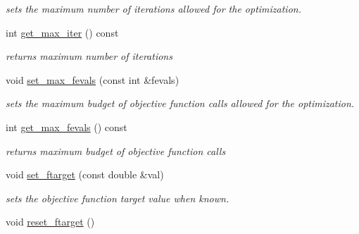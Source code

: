 \begin{DoxyCompactItemize}
\begin{DoxyCompactList}\small\item\em sets the maximum number of iterations allowed for the optimization. \end{DoxyCompactList}\item 
int \hyperlink{classlibcmaes_1_1Parameters_a95b8ff475b28b2cbf89cd147ab09eeee}{get\-\_\-max\-\_\-iter} () const 
\begin{DoxyCompactList}\small\item\em returns maximum number of iterations \end{DoxyCompactList}\item 
void \hyperlink{classlibcmaes_1_1Parameters_aa924cb4c8ffee0d148b63f5c0b55b4ce}{set\-\_\-max\-\_\-fevals} (const int \&fevals)
\begin{DoxyCompactList}\small\item\em sets the maximum budget of objective function calls allowed for the optimization. \end{DoxyCompactList}\item 
int \hyperlink{classlibcmaes_1_1Parameters_af738c73caee922feff43ba29218ea8ad}{get\-\_\-max\-\_\-fevals} () const 
\begin{DoxyCompactList}\small\item\em returns maximum budget of objective function calls \end{DoxyCompactList}\item 
void \hyperlink{classlibcmaes_1_1Parameters_a6ace7e5d230fcf82c70ba2dd3a801f97}{set\-\_\-ftarget} (const double \&val)
\begin{DoxyCompactList}\small\item\em sets the objective function target value when known. \end{DoxyCompactList}\item 
\hypertarget{classlibcmaes_1_1Parameters_aec14ab6c39a12e347080fa7e0f2e7c9f}{void \hyperlink{classlibcmaes_1_1Parameters_aec14ab6c39a12e347080fa7e0f2e7c9f}{reset\-\_\-ftarget} ()}\label{classlibcmaes_1_1Parameters_aec14ab6c39a12e347080fa7e0f2e7c9f}


\end{DoxyCompactItemize}
